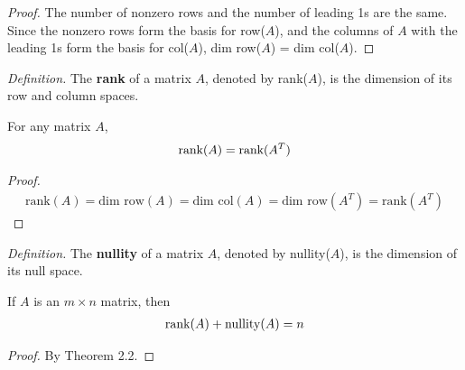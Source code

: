 \begin{proof}
	The number of nonzero rows and the number of leading 1s are the same. Since the nonzero rows form the basis for row($A$), and the columns of $A$ with the leading 1s form the basis for col($A$), dim row($A$) = dim col($A$).
\end{proof}

\noindent \textit{Definition.} The \textbf{rank} of a matrix $A$, denoted by rank($A$), is the dimension of its row and column spaces.

\begin{theorem}
	For any matrix $A$,
	\begin{align*}
	\textnormal{rank}(A) = \textnormal{rank}(A^T)
	\end{align*}
\end{theorem}

\begin{proof}
	\begin{align*}
	\mbox{rank}(A) = \mbox{dim row}(A) = \mbox{dim col}(A) = \mbox{dim row}(A^T) = \mbox{rank}(A^T)
	\end{align*}
\end{proof}

\noindent \textit{Definition.} The \textbf{nullity} of a matrix $A$, denoted by nullity($A$), is the dimension of its null space.

\begin{theorem}
	If $A$ is an $m \times n$ matrix, then \begin{align*}
	\textnormal{rank}(A) + \textnormal{nullity}(A) = n
	\end{align*}
\end{theorem}

\begin{proof}
	By Theorem 2.2.
\end{proof}

